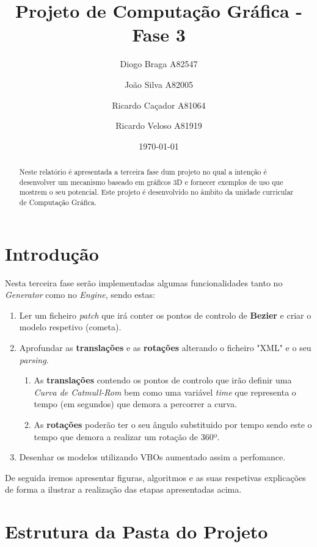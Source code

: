 \documentclass[a4paper]{article}
\title{Projeto de Computação Gráfica - Fase 3}
\author{Diogo Braga A82547 \and João Silva A82005 \and Ricardo Caçador A81064
\and Ricardo Veloso A81919}
\date{\today}
\begin{document}
\maketitle

\begin{abstract}
Neste relatório é apresentada a terceira fase dum projeto no qual a intenção é desenvolver um mecanismo baseado em gráficos 3D e fornecer exemplos de uso que mostrem o seu potencial. Este projeto é desenvolvido no âmbito da unidade curricular de Computação Gráfica.
\end{abstract}


\newpage

\tableofcontents


\newpage

\section{Introdução}
\label{sec:intro}

Nesta terceira fase serão implementadas algumas funcionalidades tanto no \textit{Generator} como no \textit{Engine}, sendo estas:

\begin{enumerate}
\item Ler um ficheiro \textit{patch} que irá conter os pontos de controlo de \textbf{Bezier} e criar o modelo respetivo (cometa).
\item Aprofundar as \textbf{translações} e as \textbf{rotações} alterando o ficheiro "XML" e o seu \textit{parsing}.
  \begin{enumerate}
  \item As \textbf{translações} contendo os pontos de controlo que irão definir uma \textit{Curva de Catmull-Rom} bem como uma variável \textit{time} que representa o tempo (em segundos) que demora a percorrer a curva.
  \item As \textbf{rotações} poderão ter o seu ângulo substituido por tempo sendo este o tempo que demora a realizar um rotação de 360º.
  \end{enumerate}
\item Desenhar os modelos utilizando VBOs aumentado assim a perfomance.
\end{enumerate}

De seguida iremos apresentar figuras, algoritmos e as suas respetivas explicações de forma a ilustrar a realização das etapas apresentadas acima.

\newpage

\section{Estrutura da Pasta do Projeto}
\label{sec:estrutura}
\end{document}
